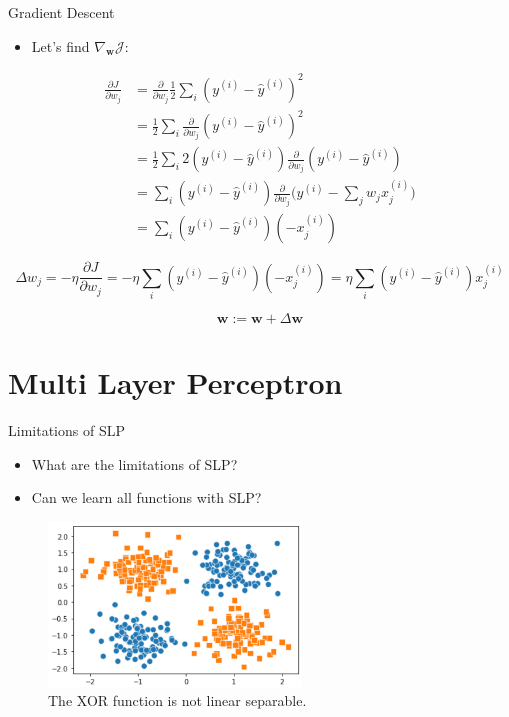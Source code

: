 \documentclass[compress,oilve,t]{beamer}
\begin{document}
\begin{frame}{Gradient Descent}
	\begin{itemize}
		\item Let's find $\nabla_{\bm{w}} \mathcal{J}$:
	\end{itemize}
	\vspace*{0.5em}
	\begin{equation*} 
		\begin{split}
			\frac{\partial J}{\partial w_j} & = \frac{\partial }{\partial w_j} \frac{1}{2} \sum_i  (y^{(i)} - \hat{y}^{(i)})^2 \\
			& = \frac{1}{2} \sum_i \frac{\partial}{\partial w_j} (y^{(i)} - \hat{y}^{(i)})^2 \\
			& = \frac{1}{2} \sum_i 2 (y^{(i)} - \hat{y}^{(i)}) \frac{\partial}{\partial w_j} (y^{(i)} - \hat{y}^{(i)}) \\ 
			& = \sum_i (y^{(i)} - \hat{y}^{(i)}) \frac{\partial}{\partial w_j} \bigg(y^{(i)} - \sum_j w_j x^{(i)}_{j}\bigg) \\
			& = \sum_i  (y^{(i)} - \hat{y}^{(i)})(-x^{(i)}_{j}) 
		\end{split}
	\end{equation*}
	
	$$\Delta w_j = - \eta \frac{\partial J}{\partial w_j} = - \eta \sum_i  (y^{(i)} - \hat{y}^{(i)})(- x^{(i)}_{j}) = \eta \sum_i (y^{(i)} - \hat{y}^{(i)})x^{(i)}_{j}$$
	
	$$\mathbf{w} := \mathbf{w} + \Delta \mathbf{w}$$
\end{frame}



\section{Multi Layer Perceptron}
\begin{frame}{Limitations of SLP}
	\begin{itemize}
		\item What are the limitations of SLP?
		\item Can we learn all functions with SLP?
	\end{itemize}
	\begin{figure}[H]
		\centering
		\includegraphics[width=0.6\textwidth]{Figs/xor.png}
		\caption{The XOR function is not linear separable.}
	\end{figure}
\end{frame}
\end{document}
